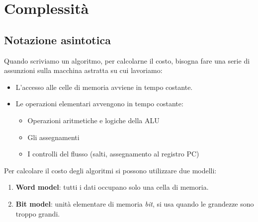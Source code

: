 \section{Complessità}

\subsection{Notazione asintotica}
Quando scriviamo un algoritmo, per calcolarne il costo, bisogna fare una serie di assunzioni sulla macchina astratta su cui lavoriamo:
\begin{itemize}
	\item L'accesso alle celle di memoria avviene in tempo costante.
	\item Le operazioni elementari avvengono in tempo costante:
	\begin{itemize}
		\item Operazioni aritmetiche e logiche della ALU
		\item Gli assegnamenti
		\item I controlli del flusso (salti, assegnamento al registro PC)
	\end{itemize}
	
\end{itemize}
Per calcolare il costo degli algoritmi si possono utilizzare due modelli:
\begin{enumerate}
	\item \textbf{Word model}: tutti i dati occupano solo una cella di memoria.
	\item \textbf{Bit model}: unità elementare di memoria \emph{bit}, si usa quando le grandezze sono troppo grandi.
\end{enumerate}


